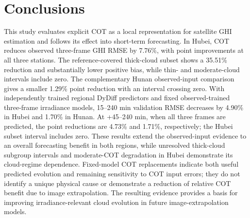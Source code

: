 \documentclass[11pt]{article}
\begin{document}
\section{Conclusions}
This study evaluates explicit COT as a local representation for satellite GHI estimation and follows its effect into short-term forecasting. In Hubei, COT reduces observed three-frame GHI RMSE by 7.76\%, with point improvements at all three stations. The reference-covered thick-cloud subset shows a 35.51\% reduction and substantially lower positive bias, while thin- and moderate-cloud intervals include zero. The complementary Hunan observed-input comparison gives a smaller 1.29\% point reduction with an interval crossing zero. With independently trained regional DyDiff predictors and fixed observed-trained three-frame irradiance models, 15--240 min validation RMSE decreases by 4.90\% in Hubei and 1.70\% in Hunan. At +45--240 min, when all three frames are predicted, the point reductions are 4.73\% and 1.71\%, respectively; the Hubei subset interval includes zero. These results extend the observed-input evidence to an overall forecasting benefit in both regions, while unresolved thick-cloud subgroup intervals and moderate-COT degradation in Hubei demonstrate its cloud-regime dependence. Fixed-model COT replacements indicate both useful predicted evolution and remaining sensitivity to COT input errors; they do not identify a unique physical cause or demonstrate a reduction of relative COT benefit due to image extrapolation. The resulting evidence provides a basis for improving irradiance-relevant cloud evolution in future image-extrapolation models.
\FloatBarrier
\end{document}
